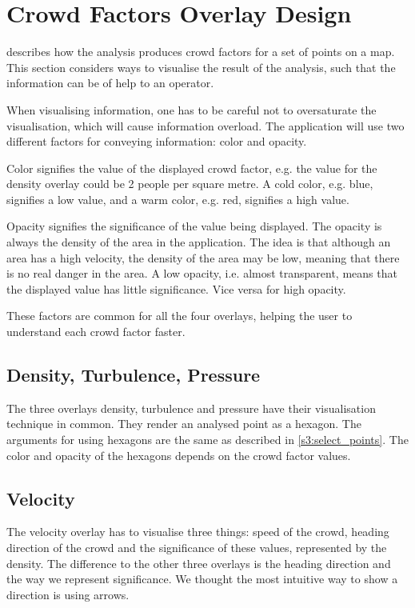 \section{Crowd Factors Overlay Design} \label{sec:s4_overlay}

 describes how the analysis produces crowd factors for a set of points on a map. This section considers ways to visualise the result of the analysis, such that the information can be of help to an operator.

When visualising information, one has to be careful not to oversaturate the visualisation, which will cause information overload. The application will use two different factors for conveying information: color and opacity.

Color signifies the value of the displayed crowd factor, e.g. the value for the density overlay could be 2 people per square metre. A cold color, e.g. blue, signifies a low value, and a warm color, e.g. red, signifies a high value. 

Opacity signifies the significance of the value being displayed. The opacity is always the density of the area in the application. The idea is that although an area has a high velocity, the density of the area may be low, meaning that there is no real danger in the area. A low opacity, i.e. almost transparent, means that the displayed value has little significance. Vice versa for high opacity. 

These factors are common for all the four overlays, helping the user to understand each crowd factor faster.

\subsection{Density, Turbulence, Pressure}
The three overlays density, turbulence and pressure have their visualisation technique in common. They render an analysed point as a hexagon. The arguments for using hexagons are the same as described in \cref{s3:select_points}. The color and opacity of the hexagons depends on the crowd factor values.

\subsection{Velocity}
The velocity overlay has to visualise three things: speed of the crowd, heading direction of the crowd and the significance of these values, represented by the density. The difference to the other three overlays is the heading direction and the way we represent significance. We thought the most intuitive way to show a direction is using arrows. 


